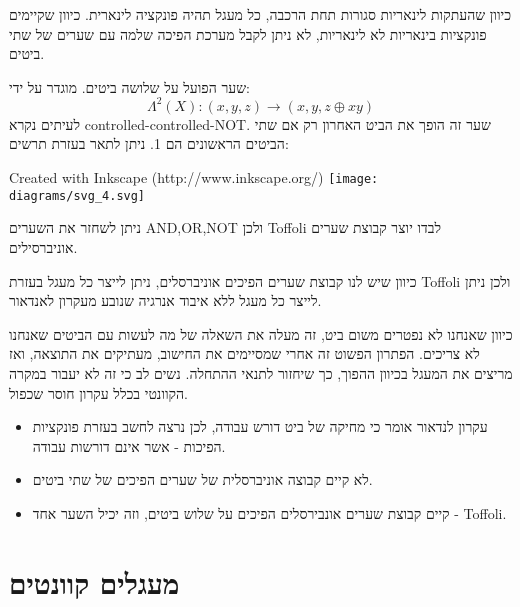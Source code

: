 \documentclass{tstextbook}
\begin{document}
\begin{corollary}
כיוון שהעתקות לינאריות סגורות תחת הרכבה, כל מעגל תהיה פונקציה לינארית. כיוון שקיימים פונקציות בינאריות לא לינאריות, לא ניתן לקבל מערכת הפיכה שלמה עם שערים של שתי ביטים.

\end{corollary}
\begin{definition}
שער הפועל על שלושה ביטים. מוגדר על ידי:
$$\Lambda^{2}(X):(x,y,z)\longrightarrow(x,y,z\oplus x y)$$
לעיתים נקרא controlled-controlled-NOT. שער זה הופך את הביט האחרון רק אם שתי הביטים הראשונים הם 1. ניתן לתאר בעזרת תרשים:

 Created with Inkscape (http://www.inkscape.org/) \texttt{[image: diagrams/svg\_4.svg]}
\end{definition}
\begin{proposition}
ניתן לשחזר את השערים AND,OR,NOT ולכן Toffoli לבדו יוצר קבוצת שערים אוניברסילים.

\end{proposition}
\begin{corollary}
כיוון שיש לנו קבוצת שערים הפיכים אוניברסלים, ניתן לייצר כל מעגל בעזרת Toffoli ולכן ניתן לייצר כל מעגל ללא איבוד אנרגיה שנובע מעקרון לאנדאור.

\end{corollary}
\begin{remark}
כיוון שאנחנו לא נפטרים משום ביט, זה מעלה את השאלה של מה לעשות עם הביטים שאנחנו לא צריכים. הפתרון הפשוט זה אחרי שמסיימים את החישוב, מעתיקים את התוצאה, ואז מריצים את המעגל בכיוון ההפוך, כך שיחזור לתנאי ההתחלה. נשים לב כי זה לא יעבור במקרה הקוונטי בכלל עקרון חוסר שכפול.

\end{remark}
\begin{summary}
  \begin{itemize}
    \item עקרון לנדאור אומר כי מחיקה של ביט דורש עבודה, לכן נרצה לחשב בעזרת פונקציות הפיכות - אשר אינם דורשות עבודה.
    \item לא קיים קבוצה אוניברסלית של שערים הפיכים של שתי ביטים.
    \item קיים קבוצת שערים אונבירסלים הפיכים על שלוש ביטים, וזה יכיל השער אחד - Toffoli.
  \end{itemize}
\end{summary}
\chapter{מעגלים קוונטים}
\end{document}
